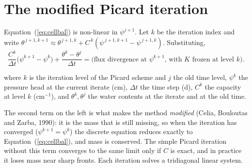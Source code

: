 \section{The modified Picard iteration}
Equation~(\ref{eq:cellbal}) is non-linear in $\psi^{j+1}$. Let $k$ be the iteration index and write $\theta^{\,j+1,k+1}\approx\theta^{\,j+1,k}+C^{\,k}(\psi^{\,j+1,k+1}-\psi^{\,j+1,k})$. Substituting,
\begin{equation}\label{eq:picard}
\frac{C^{k}}{\Delta t}\bigl(\psi^{k+1}-\psi^{k}\bigr)+\frac{\theta^{k}-\theta^{j}}{\Delta t}=\text{(flux divergence at }\psi^{k+1}\text{, with }K\text{ frozen at level }k).
\end{equation}
\par\noindent where $k$ is the iteration level of the Picard scheme and $j$ the old time level, $\psi^{k}$ the pressure head at the current iterate (cm), $\Delta t$ the time step (d), $C^{k}$ the capacity at level $k$ (cm$^{-1}$), and $\theta^{k},\theta^{j}$ the water contents at the iterate and at the old time.

The second term on the left is what makes the method \emph{modified} (Celia, Bouloutas and Zarba, 1990): it is the mass that is still missing, so when the iteration has converged ($\psi^{k+1}=\psi^k$) the discrete equation reduces exactly to Equation~(\ref{eq:cellbal}), and mass is conserved. The simple Picard iteration without this term converges to the same limit only if $C$ is exact, and in practice it loses mass near sharp fronts. Each iteration solves a tridiagonal linear system.


